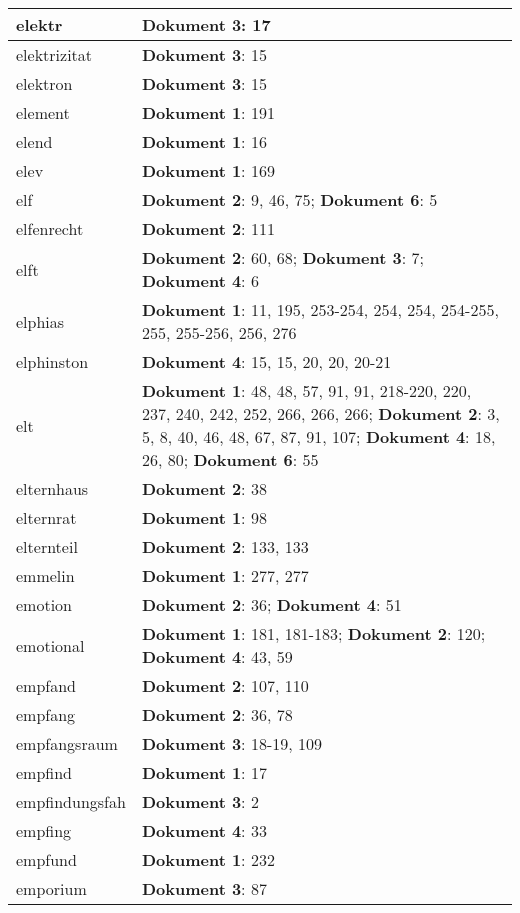 \documentclass[a5paper]{article}
\begin{document}
\begin{longtable}[l]{|l|p{3in}|}
\hline
elektr & \textbf{Dokument 3}: 17 \\
\hline
elektrizitat & \textbf{Dokument 3}: 15 \\
\hline
elektron & \textbf{Dokument 3}: 15 \\
\hline
element & \textbf{Dokument 1}: 191 \\
\hline
elend & \textbf{Dokument 1}: 16 \\
\hline
elev & \textbf{Dokument 1}: 169 \\
\hline
elf & \textbf{Dokument 2}: 9, 46, 75; \textbf{Dokument 6}: 5 \\
\hline
elfenrecht & \textbf{Dokument 2}: 111 \\
\hline
elft & \textbf{Dokument 2}: 60, 68; \textbf{Dokument 3}: 7; \textbf{Dokument 4}: 6 \\
\hline
elphias & \textbf{Dokument 1}: 11, 195, 253-254, 254, 254, 254-255, 255, 255-256, 256, 276 \\
\hline
elphinston & \textbf{Dokument 4}: 15, 15, 20, 20, 20-21 \\
\hline
elt & \textbf{Dokument 1}: 48, 48, 57, 91, 91, 218-220, 220, 237, 240, 242, 252, 266, 266, 266; \textbf{Dokument 2}: 3, 5, 8, 40, 46, 48, 67, 87, 91, 107; \textbf{Dokument 4}: 18, 26, 80; \textbf{Dokument 6}: 55 \\
\hline
elternhaus & \textbf{Dokument 2}: 38 \\
\hline
elternrat & \textbf{Dokument 1}: 98 \\
\hline
elternteil & \textbf{Dokument 2}: 133, 133 \\
\hline
emmelin & \textbf{Dokument 1}: 277, 277 \\
\hline
emotion & \textbf{Dokument 2}: 36; \textbf{Dokument 4}: 51 \\
\hline
emotional & \textbf{Dokument 1}: 181, 181-183; \textbf{Dokument 2}: 120; \textbf{Dokument 4}: 43, 59 \\
\hline
empfand & \textbf{Dokument 2}: 107, 110 \\
\hline
empfang & \textbf{Dokument 2}: 36, 78 \\
\hline
empfangsraum & \textbf{Dokument 3}: 18-19, 109 \\
\hline
empfind & \textbf{Dokument 1}: 17 \\
\hline
empfindungsfah & \textbf{Dokument 3}: 2 \\
\hline
empfing & \textbf{Dokument 4}: 33 \\
\hline
empfund & \textbf{Dokument 1}: 232 \\
\hline
emporium & \textbf{Dokument 3}: 87 \\

\end{longtable}
\end{document}
